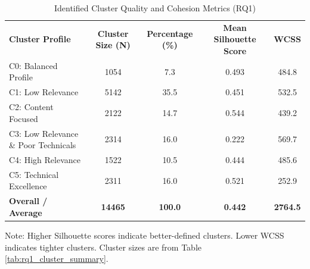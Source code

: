 \documentclass[a4paper,fleqn]{cas-sc}
\newcommand{\sbf}[1]{\scriptsize\textbf{#1}}
\newcommand{\dmidrule}{\specialrule{0.8pt}{0pt}{0.4pt}\specialrule{0.8pt}{0pt}{0pt}}
\begin{document}
\begin{table}[htbp!]
\centering
\caption{Identified Cluster Quality and Cohesion Metrics (RQ1)}
\label{tab:cluster_quality}
\small
\setlength{\tabcolsep}{3pt}
\renewcommand{\arraystretch}{1}
\begin{threeparttable}
\begin{tabular*}{\textwidth}{l@{\extracolsep{\fill}} S[table-format=4.0] S[table-format=2.1] S[table-format=1.3] S[table-format=6.1]}
\toprule
\sbf{Cluster Profile} & {\sbf{Cluster Size (N)}} & {\sbf{Percentage (\%)}} & {\sbf{Mean Silhouette Score}} & {\sbf{WCSS}} \\
\dmidrule
C0: Balanced Profile & 1054 & 7.3 & 0.493 & 484.8 \\
C1: Low Relevance & 5142 & 35.5 & 0.451 & 532.5 \\
C2: Content Focused & 2122 & 14.7 & 0.544 & 439.2 \\
C3: Low Relevance \& Poor Technicals & 2314 & 16.0 & 0.222 & 569.7 \\
C4: High Relevance & 1522 & 10.5 & 0.444 & 485.6 \\
C5: Technical Excellence & 2311 & 16.0 & 0.521 & 252.9 \\
\midrule
\sbf{Overall / Average} & \sbf{14465} & \sbf{100.0} & \sbf{0.442} & \sbf{2764.5} \\
\bottomrule
\end{tabular*}
\begin{tablenotes}[flushleft]
\scriptsize
\item Note: Higher Silhouette scores indicate better-defined clusters. Lower WCSS indicates tighter clusters. Cluster sizes are from Table \ref{tab:rq1_cluster_summary}.
\end{tablenotes}
\end{threeparttable}
\end{table}
\end{document}
